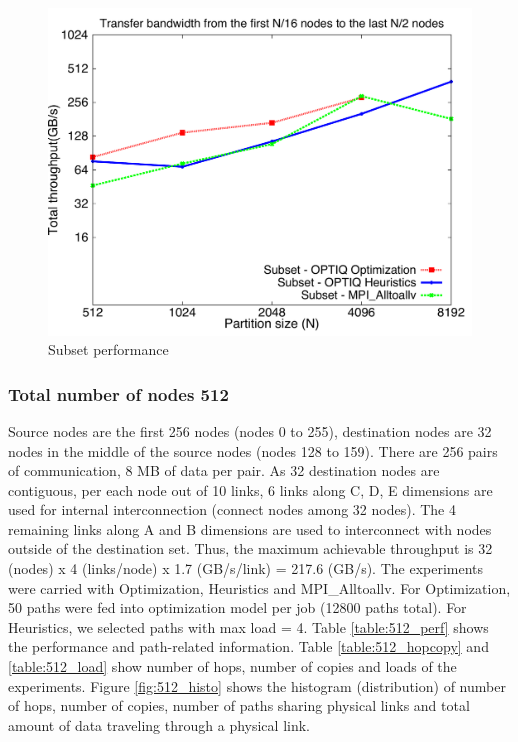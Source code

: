 \documentclass[letter]{article}
\begin{document}
\begin{figure}[h]
\vspace{-0.1in}
\centering
\includegraphics[scale=0.40]{report_figures/constantr_87.pdf}
\vspace{-0.1in}
\caption{Subset performance}
\vspace{-0.1in}
\label{fig:patterns}
\end{figure}

\subsubsection {Total number of nodes 512}

Source nodes are the first 256 nodes (nodes 0 to 255), destination nodes are 32 nodes in the middle of the source nodes (nodes 128 to 159). There are 256 pairs of communication, 8 MB of data per pair. As 32 destination nodes are contiguous, per each node out of 10 links, 6 links along C, D, E dimensions are used for internal interconnection (connect nodes among 32 nodes). The 4 remaining links along A and B dimensions are used to interconnect with nodes outside of the destination set. Thus, the maximum achievable throughput is 32 (nodes) x 4 (links/node) x 1.7 (GB/s/link) = 217.6 (GB/s). The experiments were carried with Optimization, Heuristics and MPI\_Alltoallv. For Optimization, 50 paths were fed into optimization model per job (12800 paths total). For Heuristics, we selected paths with max load = 4. Table \ref{table:512_perf} shows the performance and path-related information. Table \ref{table:512_hopcopy} and \ref{table:512_load} show number of hops, number of copies and loads of the experiments. Figure \ref{fig:512_histo} shows the histogram (distribution) of number of hops, number of copies, number of paths sharing physical links and total amount of data traveling through a physical link.
\end{document}
